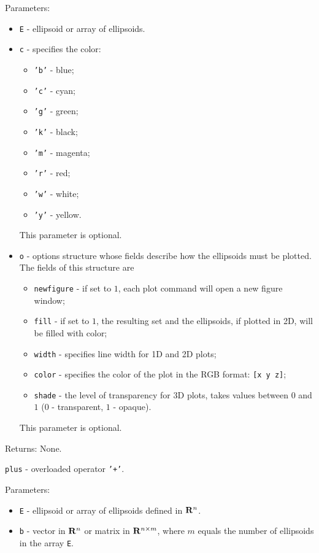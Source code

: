Parameters:
\begin{itemize}
\item {\tt E} - ellipsoid or array of ellipsoids.
\item {\tt c} - specifies the color:
\begin{itemize}
\item {\tt 'b'} - blue;
\item {\tt 'c'} - cyan;
\item {\tt 'g'} - green;
\item {\tt 'k'} - black;
\item {\tt 'm'} - magenta;
\item {\tt 'r'} - red;
\item {\tt 'w'} - white;
\item {\tt 'y'} - yellow.
\end{itemize}
This parameter is optional.
\item {\tt o} - options structure whose fields describe how the ellipsoids
must be plotted. The fields of this structure are
\begin{itemize}
\item {\tt newfigure} - if set to $1$, each plot command will open a new
figure window;
\item {\tt fill} - if set to $1$, the resulting set and the ellipsoids,
if plotted in 2D, will be filled with color;
\item {\tt width} - specifies line width for 1D and 2D plots;
\item {\tt color} - specifies the color of the plot in the RGB format:
{\tt [x y z]};
\item {\tt shade} - the level of transparency for 3D plots, takes values
between $0$ and $1$ ($0$ - transparent, $1$ - opaque).
\end{itemize}
This parameter is optional.
\end{itemize}

Returns: None.

\newpage

{\Large {\tt plus}} - overloaded operator {\tt '+'}.

Parameters:
\begin{itemize}
\item {\tt E} - ellipsoid or array of ellipsoids defined in ${\bf R}^n$.
\item {\tt b} - vector in ${\bf R}^n$ or matrix in ${\bf R}^{n\times m}$,
where $m$ equals the number of ellipsoids in the array {\tt E}.
\end{itemize}

